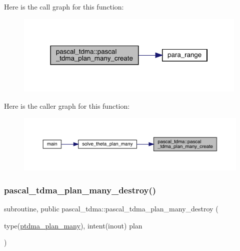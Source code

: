 Here is the call graph for this function\+:
\nopagebreak
\begin{figure}[H]
\begin{center}
\leavevmode
\includegraphics[width=315pt]{namespacepascal__tdma_a7e9c24b343ae949044eccc8692dcc6e9_cgraph}
\end{center}
\end{figure}
Here is the caller graph for this function\+:
\nopagebreak
\begin{figure}[H]
\begin{center}
\leavevmode
\includegraphics[width=350pt]{namespacepascal__tdma_a7e9c24b343ae949044eccc8692dcc6e9_icgraph}
\end{center}
\end{figure}
\mbox{\label{namespacepascal__tdma_a8438e6774617871b147af9ec8bdad6ce}} 
\subsubsection{\texorpdfstring{pascal\_tdma\_plan\_many\_destroy()}{pascal\_tdma\_plan\_many\_destroy()}}
{\footnotesize\ttfamily subroutine, public pascal\+\_\+tdma\+::pascal\+\_\+tdma\+\_\+plan\+\_\+many\+\_\+destroy (\begin{DoxyParamCaption}\item[{type(\mbox{\hyperlink{structpascal__tdma_1_1ptdma__plan__many}{ptdma\+\_\+plan\+\_\+many}}), intent(inout)}]{plan }\end{DoxyParamCaption})}




